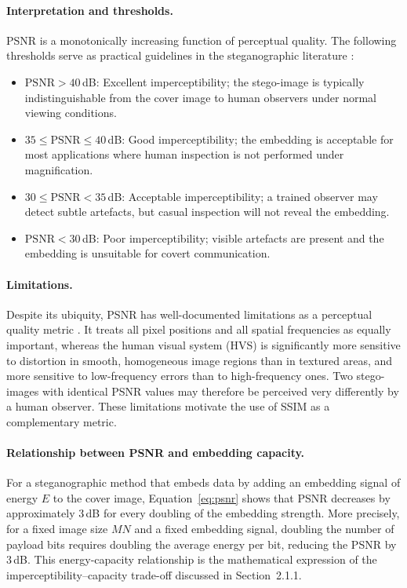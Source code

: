 \documentclass[12pt,a4paper,oneside]{report}
\begin{document}
	\paragraph{Interpretation and thresholds.}
	PSNR is a monotonically increasing function of perceptual quality. The following thresholds
	serve as practical guidelines in the steganographic literature \cite{cox2007digital}:
	\begin{itemize}
		\item $\mathrm{PSNR} > 40$\,dB: Excellent imperceptibility; the stego-image is typically
		indistinguishable from the cover image to human observers under normal viewing conditions.
		\item $35 \leq \mathrm{PSNR} \leq 40$\,dB: Good imperceptibility; the embedding is acceptable
		for most applications where human inspection is not performed under magnification.
		\item $30 \leq \mathrm{PSNR} < 35$\,dB: Acceptable imperceptibility; a trained observer may
		detect subtle artefacts, but casual inspection will not reveal the embedding.
		\item $\mathrm{PSNR} < 30$\,dB: Poor imperceptibility; visible artefacts are present and
		the embedding is unsuitable for covert communication.
	\end{itemize}
	
	\paragraph{Limitations.}
	Despite its ubiquity, PSNR has well-documented limitations as a perceptual quality metric
	\cite{wang2004image}. It treats all pixel positions and all spatial frequencies as equally
	important, whereas the human visual system (HVS) is significantly more sensitive to distortion
	in smooth, homogeneous image regions than in textured areas, and more sensitive to low-frequency
	errors than to high-frequency ones. Two stego-images with identical PSNR values may therefore
	be perceived very differently by a human observer. These limitations motivate the use of SSIM
	as a complementary metric.
	
	\paragraph{Relationship between PSNR and embedding capacity.}
	For a steganographic method that embeds data by adding an embedding signal of energy $E$ to the
	cover image, Equation~\eqref{eq:psnr} shows that PSNR decreases by approximately $3$\,dB for
	every doubling of the embedding strength. More precisely, for a fixed image size $MN$ and a
	fixed embedding signal, doubling the number of payload bits requires doubling the average energy
	per bit, reducing the PSNR by $3$\,dB. This energy-capacity relationship is the mathematical
	expression of the imperceptibility--capacity trade-off discussed in Section~2.1.1.
	
\end{document}
